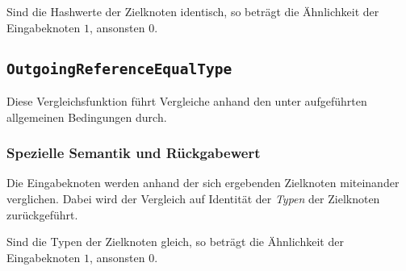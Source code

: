 Sind die Hashwerte der Zielknoten identisch, so beträgt die Ähnlichkeit der Eingabeknoten $1$, ansonsten $0$.


%
%
\subsection{\texttt{OutgoingReferenceEqualType}}
Diese Vergleichsfunktion führt Vergleiche anhand den unter\mylinebreak{} aufgeführten allgemeinen Bedingungen durch.

\subsubsection*{Spezielle Semantik und Rückgabewert}
Die Eingabeknoten werden anhand der sich ergebenden Zielknoten miteinander verglichen. Dabei wird der Vergleich auf Identität der \emph{Typen} der Zielknoten zurückgeführt.

Sind die Typen der Zielknoten gleich, so beträgt die Ähnlichkeit der Eingabeknoten $1$, ansonsten $0$.